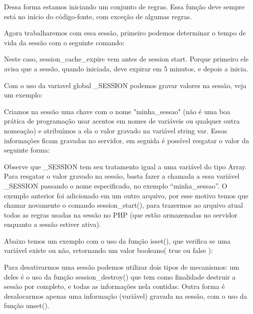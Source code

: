 

Dessa forma estamos iniciando um conjunto de regras. Essa função deve sempre está no início do código-fonte, com exceção de algumas regras.

Agora trabalharemos com essa sessão, primeiro podemos determinar o tempo de vida da sessão com o seguinte comando:



Neste caso, session_cache_expire vem antes de session start. Porque primeiro ele avisa que a sessão, quando iniciada, deve expirar em 5 minutos, e depois a inicia.

Com o uso da variavel global \textdollar_SESSION podemos gravar valores na sessão, veja um exemplo:



Criamos na sessão uma chave com o nome "minha_sessao" (não é uma boa prática de programação usar acentos em nomes de variáveis ou qualquer outra nomeação) e atribuímos a ela o valor gravado na variável string var. Essas informações ficam gravadas no servidor, em seguida é possível resgatar o valor da seguinte forma:



Observe que \textdollar_SESSION tem seu tratamento igual a uma variável do tipo Array. Para resgatar o valor gravado na sessão, basta fazer a chamada a essa variável \textdollar_SESSION passando o nome especificado, no exemplo “minha_sessao”. O exemplo anterior foi adicionado em um outro arquivo, por esse motivo temos que chamar novamente o comando session_start(), para trazermos ao arquivo atual todas as regras usadas na sessão no PHP (que estão armazenadas no servidor enquanto a sessão estiver ativa).

Abaixo temos um exemplo com o uso da função isset(), que verifica se uma variável existe ou não, retornando um valor booleano( true ou false ):



Para desativarmos uma sessão podemos utilizar dois tipos de mecanismos: um deles é o uso da função session_destroy() que tem como finalidade destruir a sessão por completo, e todas as informações nela contidas. Outra forma é desalocarmos apenas uma informação (variável) gravada na sessão, com o uso da função unset().

